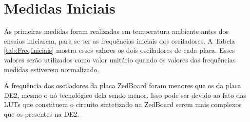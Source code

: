 \section{Medidas Iniciais}
\label{sec:ResMedidasIniciais}

As primeiras medidas foram realizadas em temperatura ambiente antes dos ensaios iniciarem, para se ter as frequências iniciais dos osciladores. A Tabela \ref{tab:FreqIniciais} mostra esses valores os dois osciladores de cada placa. Esses valores serão utilizados como valor unitário quando os valores das frequências medidas estiverem normalizado.



A frequência dos osciladores da placa ZedBoard foram menores que os da placa DE2, mesmo o nó tecnológico dela sendo menor. Isso pode ser devido ao fato das LUTs que constituem o circuito sintetizado na ZedBoard serem mais complexos que os presentes na DE2.